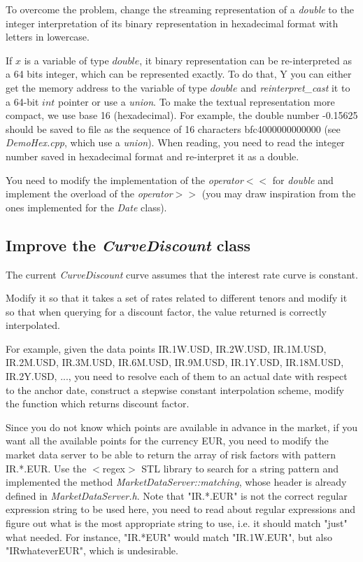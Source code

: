 \documentclass[10pt]{article}
\begin{document}
To overcome the problem, change the streaming representation of a \textit{double} to the integer interpretation of its binary representation in hexadecimal format with letters in lowercase.

If $x$ is a variable of type $double$, it binary representation can be re-interpreted as a 64 bits integer, which can be represented exactly. To do that, Y
you can either get the memory address to the variable of type $double$ and \textit{reinterpret\_cast} it to a 64-bit $int$ pointer or use a \textit{union}. To make the textual representation more compact, we use base 16 (hexadecimal). For example, the double number -0.15625 should be saved to file as the sequence of 16 characters bfc4000000000000 (see \textit{DemoHex.cpp}, which use a \textit{union}). When reading, you need to read the integer number saved in hexadecimal format and re-interpret it as a double.

You need to modify the implementation of the \textit{operator$<<$} for \textit{double} and implement the overload of the \textit{operator$>>$} (you may draw inspiration from the ones implemented for the \textit{Date} class).

\subsection{Improve the \textit{CurveDiscount} class}
The current \textit{CurveDiscount} curve assumes that the interest rate curve is constant.

Modify it so that it takes a set of rates related to different tenors and modify it so that when querying for a discount factor, the value returned is correctly interpolated.

For example, given the data points {IR.1W.USD, IR.2W.USD, IR.1M.USD, IR.2M.USD, IR.3M.USD, IR.6M.USD, IR.9M.USD, IR.1Y.USD, IR.18M.USD, IR.2Y.USD, ...}, you need to resolve each of them to an actual date with respect to the anchor date, construct a stepwise constant interpolation scheme, modify the function which returns discount factor.

Since you do not know which points are available in advance in the market, if you want all the available points for the currency EUR, you need to modify the market data server to be able to return the array of risk factors with pattern IR.*.EUR. Use the $<$regex$>$ STL library to search for a string pattern and implemented the method \textit{MarketDataServer::matching}, whose header is already defined in \textit{MarketDataServer.h}. Note that "IR.*.EUR" is not the correct regular expression string to be used here, you need to read about regular expressions and figure out what is the most appropriate string to use, i.e. it should match "just" what needed. For instance, "IR.*EUR" would match "IR.1W.EUR", but also "IRwhateverEUR", which is undesirable.
\end{document}
